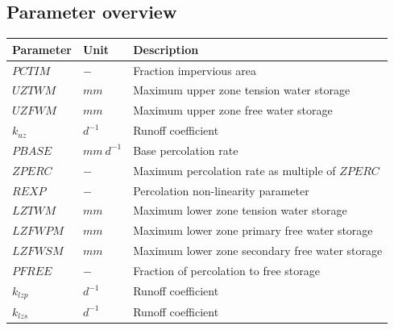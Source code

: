 \newpage
\subsection{Parameter overview}
\begin{table}[htbp]
  \centering
    \begin{tabular}{lll}
    \toprule
    Parameter & Unit  & Description \\
    \midrule
    $PCTIM$ & $-$   & Fraction impervious area \\
    $UZTWM$ & $mm$  & Maximum upper zone tension water storage \\
    $UZFWM$ & $mm$  & Maximum upper zone free water storage \\
    $k_{uz}$ & $d^{-1}$ & Runoff coefficient \\
    $PBASE$ & $mm~d^{-1}$ & Base percolation rate \\
    $ZPERC$ & $-$   & Maximum percolation rate as multiple of $ZPERC$ \\
    $REXP$ & $-$   & Percolation non-linearity parameter \\
    $LZTWM$ & $mm$  & Maximum lower zone tension water storage \\
    $LZFWPM$ & $mm$  & Maximum lower zone primary free water storage \\
    $LZFWSM$ & $mm$  & Maximum lower zone secondary free water storage \\
    $PFREE$ & $-$   & Fraction of percolation to free storage \\
    $k_{lzp}$ & $d^{-1}$ & Runoff coefficient \\
    $k_{lzs}$ & $d^{-1}$ & Runoff coefficient \\
    \bottomrule
    \end{tabular}%
  \label{tab:addlabel}%
\end{table}%

